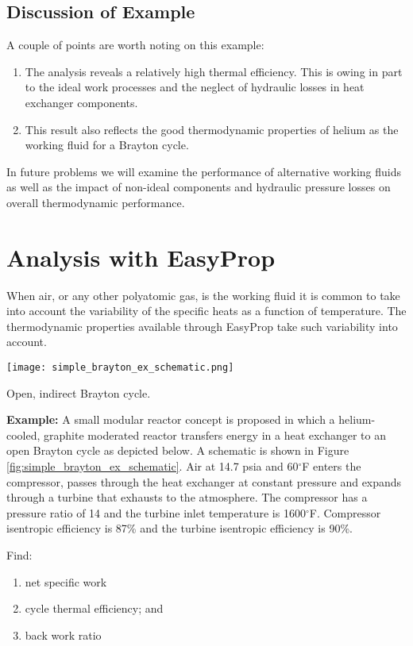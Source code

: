 \subsection{Discussion of Example}
A couple of points are worth noting on this example:
\begin{enumerate}
\item The analysis reveals a relatively high thermal efficiency.  This is owing in part to the ideal work processes and the neglect of hydraulic losses in heat exchanger components.
\item This result also reflects the good thermodynamic properties of helium as the working fluid for a Brayton cycle.  
\end{enumerate}
In future problems we will examine the performance of alternative working fluids as well as the impact of non-ideal components and hydraulic pressure losses on overall thermodynamic performance.

\section{Analysis with EasyProp}
When air, or any other polyatomic gas, is the working fluid it is common to take into account the variability of the specific heats as a function of temperature.  The thermodynamic properties available through EasyProp take such variability into account.



\begin{marginfigure}
\texttt{[image: simple\_brayton\_ex\_schematic.png]}
\caption{Open, indirect Brayton cycle.}
\label{fig:simple_brayton_ex_schematic}
\end{marginfigure}



\begin{example}
\textbf{Example:} A small modular reactor concept is proposed in which a helium-cooled, graphite moderated reactor transfers energy in a heat exchanger to an open Brayton cycle as depicted below.  A schematic is shown in Figure \ref{fig:simple_brayton_ex_schematic}. Air at 14.7 psia and 60$^{\circ}$F enters the compressor, passes through the heat exchanger at constant pressure and expands through a turbine that exhausts to the atmosphere.  The compressor has a pressure ratio of 14 and the turbine inlet temperature is 1600$^{\circ}$F. Compressor isentropic efficiency is 87\% and the turbine isentropic efficiency is 90\%.  

Find:

\begin{enumerate}
\item net specific work
\item cycle thermal efficiency; and
\item back work ratio
\end{enumerate}
\end{example} 

